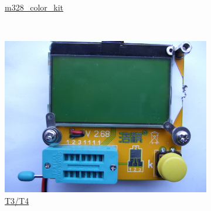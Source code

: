 \documentclass[pdftex,12pt,a4paper,english]{article}
\begin{document}
\begin{figure}[H]
\begin{subfigure}[b]{.3\textwidth}
	  {\href{run:./trunk/mega328_color_kit/.}{m328\_color\_kit}}
  \end{subfigure}
~
  \begin{subfigure}[b]{.3\textwidth}	%
    \centering
    \includegraphics[width=1.\textwidth]{../PNG/T3_Front.JPG}
	  \\ \vspace{-0.5em}
	  {\href{run:./trunk/mega328_T3_T4_st7565/.}{T3/T4}}
  \end{subfigure}
\end{figure}
\vspace{-1em}
\end{document}
